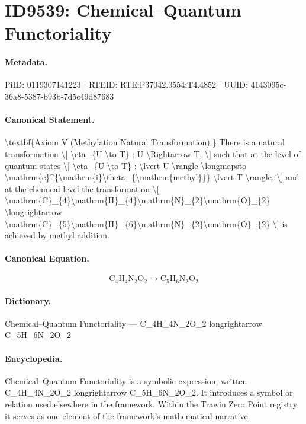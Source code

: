 \section*{ID9539: Chemical–Quantum Functoriality}
\paragraph{Metadata.}
PiID: 0119307141223 | RTEID: RTE:P37042.0554:T4.4852 | UUID: 4143095c-36a8-5387-b93b-7d5c49d87683

\paragraph{Canonical Statement.}
\textbackslash{}textbf\{Axiom V (Methylation Natural Transformation).\} There is a natural transformation \textbackslash{}[ \textbackslash{}eta\_\{U \textbackslash{}to T\} : U \textbackslash{}Rightarrow T, \textbackslash{}] such that at the level of quantum states \textbackslash{}[ \textbackslash{}eta\_\{U \textbackslash{}to T\} : \textbackslash{}lvert U \textbackslash{}rangle \textbackslash{}longmapsto \textbackslash{}mathrm\{e\}\textasciicircum{}\{\textbackslash{}mathrm\{i\}\textbackslash{}theta\_\{\textbackslash{}mathrm\{methyl\}\}\} \textbackslash{}lvert T \textbackslash{}rangle, \textbackslash{}] and at the chemical level the transformation \textbackslash{}[ \textbackslash{}mathrm\{C\}\_\{4\}\textbackslash{}mathrm\{H\}\_\{4\}\textbackslash{}mathrm\{N\}\_\{2\}\textbackslash{}mathrm\{O\}\_\{2\} \textbackslash{}longrightarrow \textbackslash{}mathrm\{C\}\_\{5\}\textbackslash{}mathrm\{H\}\_\{6\}\textbackslash{}mathrm\{N\}\_\{2\}\textbackslash{}mathrm\{O\}\_\{2\} \textbackslash{}] is achieved by methyl addition.

\paragraph{Canonical Equation.}
\[
\mathrm{C}_{4}\mathrm{H}_{4}\mathrm{N}_{2}\mathrm{O}_{2} \longrightarrow \mathrm{C}_{5}\mathrm{H}_{6}\mathrm{N}_{2}\mathrm{O}_{2}
\]

\paragraph{Dictionary.}
Chemical–Quantum Functoriality — C\_4H\_4N\_2O\_2 longrightarrow C\_5H\_6N\_2O\_2

\paragraph{Encyclopedia.}
Chemical–Quantum Functoriality is a symbolic expression, written C\_4H\_4N\_2O\_2 longrightarrow C\_5H\_6N\_2O\_2. It introduces a symbol or relation used elsewhere in the framework. Within the Trawin Zero Point registry it serves as one element of the framework's mathematical narrative.
